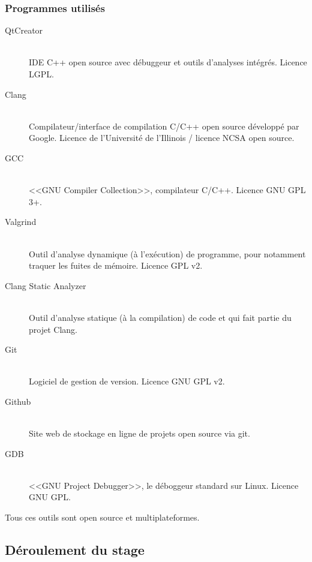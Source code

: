 \documentclass[a4paper,french,12pt]{article}
\begin{document}
		
		
		\subsubsection{Programmes utilisés}
		  \begin{description}
		   \item [QtCreator]~\\
		      IDE C++ open source avec débuggeur et outils d'analyses intégrés.
		      Licence LGPL.
		   
		   \item [Clang]~\\
		      Compilateur/interface de compilation C/C++ open source développé par Google.
		      Licence de l'Université de l'Illinois / licence  NCSA open source.
		   
		   \item [GCC]~\\
		      <<GNU Compiler Collection>>, compilateur C/C++.
		      Licence GNU GPL 3+.
		    
		   \item [Valgrind]~\\
		      Outil d'analyse dynamique (à l'exécution) de programme, pour notamment traquer les fuites de mémoire.
		      Licence GPL v2.
		   
		   \item [Clang Static Analyzer]~\\
		      Outil d'analyse statique (à la compilation) de code et qui fait partie du projet Clang.
		      
		   \item [Git]~\\
		      Logiciel de gestion de version.
		      Licence GNU GPL v2.
		      
		   \item [Github]~\\
		      Site web de stockage en ligne de projets open source via git.
		      
		   \item [GDB]~\\
		      <<GNU Project Debugger>>, le déboggeur standard sur Linux.
		      Licence GNU GPL.
		   
		  \end{description}

		Tous ces outils sont open source et multiplateformes.
		
	\subsection{Déroulement du stage}
	
\end{document}
